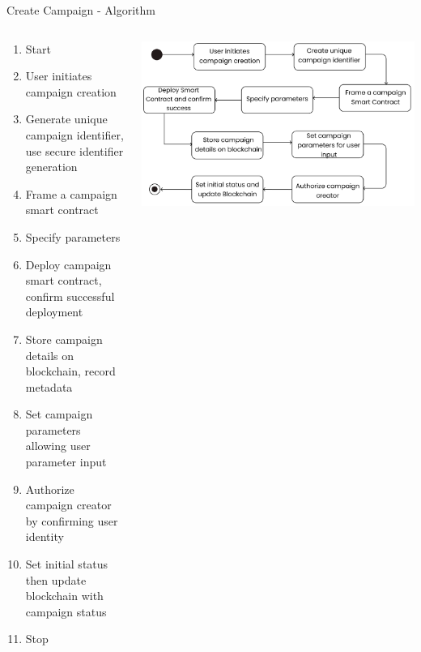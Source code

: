 \documentclass{beamer}
\begin{document}
     \begin{frame}{Create Campaign - Algorithm}
  \setlength{\itemsep}{4pt}
   \begin{columns}[T]
        \begin{column}{0.5\textwidth}
        \fontsize{7}{9}\selectfont
        \begin{enumerate}
             \item Start
            \item User initiates campaign creation
            \item Generate unique campaign identifier, use secure identifier generation 
            \item Frame a campaign smart contract 
            \item Specify parameters 
            \item Deploy campaign smart contract, confirm successful deployment
            \item Store campaign details on blockchain, record metadata
            \item Set campaign parameters allowing user parameter input
            
            \item Authorize campaign creator by confirming user identity 
            \item Set initial status then update blockchain with campaign status
            \item Stop
        \end{enumerate}
        \end{column}
        \begin{column}{0.6\textwidth}
          \vspace{20pt}
            \begin{center}
                 \includegraphics[width=\linewidth]{assets/campaign_creation_state_chart.png} 
            \end{center}
        \end{column}
    \end{columns}
    \end{frame}
    
\end{document}
